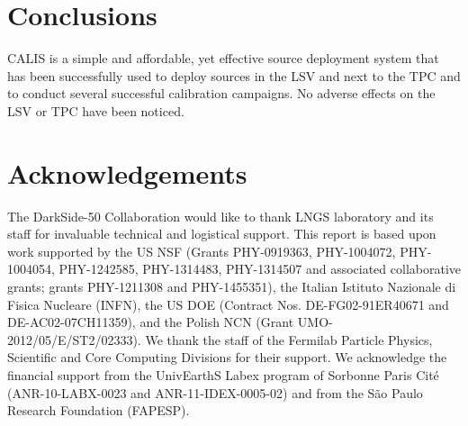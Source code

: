 \section{Conclusions}\label{sec:Conclusions}\label{sec:Conclusion}
CALIS is a simple and affordable, yet effective source deployment system that has been successfully used to deploy sources in the LSV and next to the TPC and to conduct several successful calibration campaigns. No adverse effects on the LSV or TPC have been noticed.



\section{Acknowledgements}\label{sec:Acknowledgements}
The DarkSide-50 Collaboration would like to thank LNGS laboratory and its staff for invaluable technical and logistical support. This report is based upon work supported by the US NSF (Grants PHY-0919363, PHY-1004072, PHY-1004054, PHY-1242585, PHY-1314483, PHY-1314507 and associated collaborative grants; grants PHY-1211308 and PHY-1455351), the Italian Istituto Nazionale di Fisica Nucleare (INFN), the US DOE (Contract Nos. DE-FG02-91ER40671 and DE-AC02-07CH11359), and the Polish NCN (Grant UMO-2012/05/E/ST2/02333). We thank the staff of the Fermilab Particle Physics, Scientific and Core Computing Divisions for their support. We acknowledge the financial support from the UnivEarthS Labex program of Sorbonne Paris Cit\'{e} (ANR-10-LABX-0023 and ANR-11-IDEX-0005-02) and from the S\~{a}o Paulo Research Foundation (FAPESP).